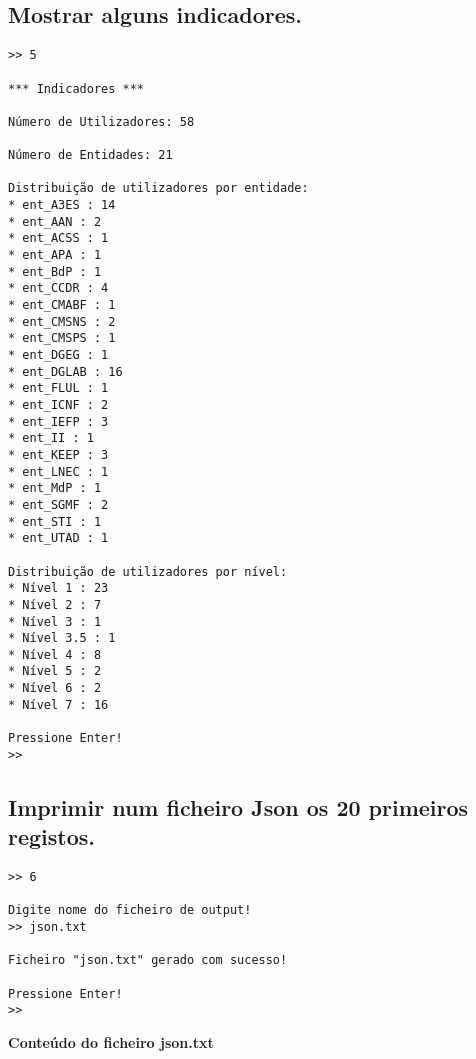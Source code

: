 \documentclass[11pt,a4paper]{report}%
\begin{document}
\subsection{Mostrar alguns indicadores.}

\begin{verbatim}
>> 5

*** Indicadores ***

Número de Utilizadores: 58

Número de Entidades: 21

Distribuição de utilizadores por entidade:
* ent_A3ES : 14
* ent_AAN : 2
* ent_ACSS : 1
* ent_APA : 1
* ent_BdP : 1
* ent_CCDR : 4
* ent_CMABF : 1
* ent_CMSNS : 2
* ent_CMSPS : 1
* ent_DGEG : 1
* ent_DGLAB : 16
* ent_FLUL : 1
* ent_ICNF : 2
* ent_IEFP : 3
* ent_II : 1
* ent_KEEP : 3
* ent_LNEC : 1
* ent_MdP : 1
* ent_SGMF : 2
* ent_STI : 1
* ent_UTAD : 1

Distribuição de utilizadores por nível:
* Nível 1 : 23
* Nível 2 : 7
* Nível 3 : 1
* Nível 3.5 : 1
* Nível 4 : 8
* Nível 5 : 2
* Nível 6 : 2
* Nível 7 : 16

Pressione Enter!
>> 
\end{verbatim}



\subsection{Imprimir num ficheiro Json os 20 primeiros registos.}

\begin{verbatim}
>> 6   

Digite nome do ficheiro de output!
>> json.txt

Ficheiro "json.txt" gerado com sucesso!

Pressione Enter!
>> 
\end{verbatim}

\textbf{Conteúdo do ficheiro json.txt}
\end{document}
